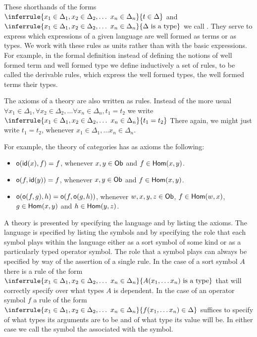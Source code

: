 These shorthands of the forms 
%
$\inferrule
  { x_1 \in \Delta_1, x_2 \in \Delta_2, \ldots\ x_n \in \Delta_n }
  { t \in \Delta } $
%
and 
%
$\inferrule
  { x_1 \in \Delta_1, x_2 \in \Delta_2, \ldots\ x_n \in \Delta_n }
  { \Delta \isatype } $
%
we call .
%
They serve to express which expressions of a given language are well formed as terms or as types.
%
We work with these rules as units rather than with the basic expressions.
%
For example, in the formal definition instead of defining the notions of well formed term and well formed type we define inductively a set of rules, to be called the derivable rules, which express the well formed types, the well formed terms their types.

The axioms of a theory are also written as rules.
%
Instead of the more usual $\forall x_1 \in \Delta_1, \forall x_2 \in \Delta_2, \ldots \forall x_n \in \Delta_n, t_1 = t_2$ we write
%
$\inferrule
  { x_1 \in \Delta_1, x_2 \in \Delta_2, \ldots\ x_n \in \Delta_n }
  { t_1 = t_2 } $
%
There again, we might just write $t_1 = t_2$, whenever $x_1 \in \Delta_1, \ldots x_n \in \Delta_n$.

For example, the theory of categories has as axioms the following:
%
\begin{itemize}
\item $\mathsf{o}(\mathsf{id}(x),f) = f$, whenever $x,y \in \mathsf{Ob}$ and $f \in \mathsf{Hom}(x,y)$.
\item $\mathsf{o}(f,\mathsf{id}(y)) = f$, whenever $x,y \in \mathsf{Ob}$ and $f \in \mathsf{Hom}(x,y)$.
\item $\mathsf{o}(\mathsf{o}(f,g),h) = \mathsf{o}(f,\mathsf{o}(g,h))$, whenever $w,x,y,z \in \mathsf{Ob}$, $f \in \mathsf{Hom}(w,x)$, $g \in \mathsf{Hom}(x,y)$ and $h \in \mathsf{Hom}(y,z)$.
\end{itemize}


A theory is presented by specifying the language and by listing the axioms.
%
The language is specified by listing the symbols and by specifying the role that each symbol plays within the language either as a sort symbol of some kind or as a particularly typed operator symbol.
%
The role that a symbol plays can always be specified by way of the assertion of a single rule.
%
In the case of a sort symbol $A$ there is a rule of the form
%
$\inferrule
  { x_1 \in \Delta_1, x_2 \in \Delta_2, \ldots\ x_n \in \Delta_n }
  { A(x_1,\ldots x_n) \isatype } $
%
that will correctly specify over what types $A$ is dependent.
%
In the case of an operator symbol $f$ a rule of the form
%
$\inferrule
  { x_1 \in \Delta_1, x_2 \in \Delta_2, \ldots\ x_n \in \Delta_n }
  { f(x_1,\ldots x_n) \in \Delta } $
%
suffices to specify of what types its arguments are to be and of what type its value will be.
%
In either case we call the symbol the  associated with the symbol.

